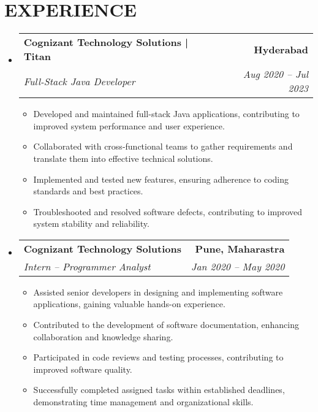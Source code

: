 \documentclass[letterpaper,11pt]{article}
\makeatletter
\newcommand{\resumeItem}[1]{\item\small{{#1 \vspace{-3pt}}}}
\newcommand{\resumeSubheading}[4]{\vspace{-2pt}\item\begin{tabular*}{0.97\textwidth}[t]{l@{\extracolsep{\fill}}r}\textbf{#1} & #2 \\ \textit{\small#3} & \textit{\small #4} \\ \end{tabular*}\vspace{-7pt}}
\newcommand{\resumeSubHeadingListStart}{\begin{itemize}[leftmargin=0.15in, label={}]}
\newcommand{\resumeSubHeadingListEnd}{\end{itemize}}
\newcommand{\resumeItemListStart}{\begin{itemize}}
\newcommand{\resumeItemListEnd}{\end{itemize}\vspace{-5pt}}
\makeatother
\begin{document}
\section{{\fontsize{9pt}{20pt}\selectfont \textbf{EXPERIENCE}}}\resumeSubHeadingListStart
\resumeSubheading{Cognizant Technology Solutions | Titan}{\textbf{Hyderabad}}{Full-Stack Java Developer}{Aug 2020 – Jul 2023}
\resumeItemListStart
\resumeItem{Developed and maintained full-stack Java applications, contributing to improved system performance and user experience.}
\resumeItem{Collaborated with cross-functional teams to gather requirements and translate them into effective technical solutions.}
\resumeItem{Implemented and tested new features, ensuring adherence to coding standards and best practices.}
\resumeItem{Troubleshooted and resolved software defects, contributing to improved system stability and reliability.}
\resumeItemListEnd
\resumeSubheading{Cognizant Technology Solutions}{\textbf{Pune, Maharastra}}{Intern – Programmer Analyst}{Jan 2020 – May 2020}
\resumeItemListStart
\resumeItem{Assisted senior developers in designing and implementing software applications, gaining valuable hands-on experience.}
\resumeItem{Contributed to the development of software documentation, enhancing collaboration and knowledge sharing.}
\resumeItem{Participated in code reviews and testing processes, contributing to improved software quality.}
\resumeItem{Successfully completed assigned tasks within established deadlines, demonstrating time management and organizational skills.}
\resumeItemListEnd
\resumeSubHeadingListEnd\vspace{-17pt}
\end{document}
